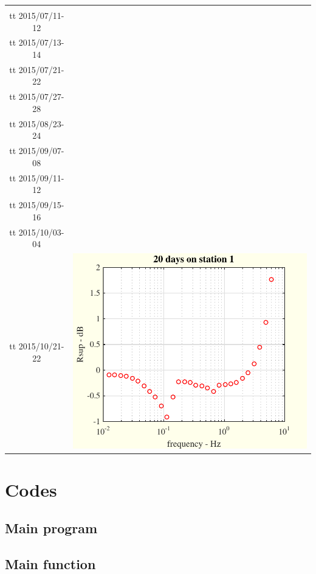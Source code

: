 \documentclass[a4paper, 12pt]{report}
\begin{document}
\begin{tabular}{cc}
 \begin{minipage}{0.35\textwidth}
 days:\\
 {tt 2015/07/11-12 }\\
{tt 2015/07/13-14 }\\
{tt 2015/07/21-22 }\\
{tt 2015/07/27-28 }\\
{tt 2015/08/23-24 }\\
{tt 2015/09/07-08 }\\
{tt 2015/09/11-12 }\\
{tt 2015/09/15-16 }\\
{tt 2015/10/03-04 }\\
{tt 2015/10/21-22 }
\end{minipage}
&
 \begin{minipage}{0.35\textwidth}
\includegraphics[scale=0.8]{example2onstation1.pdf}
\end{minipage}
\end{tabular}

\chapter{Codes}
\section{Main program}
{\tiny}

\section{Main function}
{\tiny}
\end{document}
